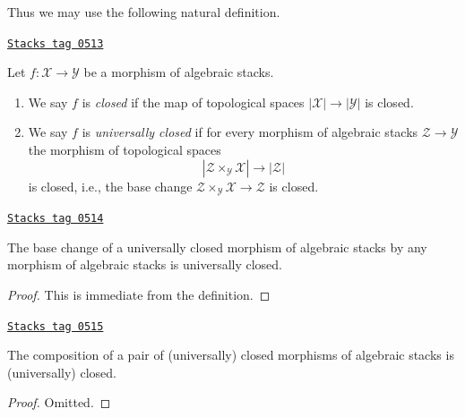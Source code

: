 Thus we may use the following natural definition.

\begin{definition}[Closed]
\label{stacks-morphisms-definition-closed}
\href{https://stacks.math.columbia.edu/tag/0513}{\texttt{Stacks tag 0513}}

Let $f : \mathcal{X} \to \mathcal{Y}$ be a morphism of algebraic stacks.
\begin{enumerate}
\item We say $f$ is {\it closed} if the map of topological
spaces $|\mathcal{X}| \to |\mathcal{Y}|$ is closed.
\item We say $f$ is {\it universally closed} if for every morphism
of algebraic stacks $\mathcal{Z} \to \mathcal{Y}$
the morphism of topological spaces
$$
|\mathcal{Z} \times_\mathcal{Y} \mathcal{X}| \to |\mathcal{Z}|
$$
is closed, i.e., the base change
$\mathcal{Z} \times_\mathcal{Y} \mathcal{X} \to \mathcal{Z}$ is closed.
\end{enumerate}
\end{definition}

\begin{lemma}
\label{stacks-morphisms-lemma-base-change-universally-closed}
\href{https://stacks.math.columbia.edu/tag/0514}{\texttt{Stacks tag 0514}}

The base change of a universally closed morphism of algebraic stacks
by any morphism of algebraic stacks is universally closed.
\end{lemma}

\begin{proof}
This is immediate from the definition.
\end{proof}

\begin{lemma}
\label{stacks-morphisms-lemma-composition-universally-closed}
\href{https://stacks.math.columbia.edu/tag/0515}{\texttt{Stacks tag 0515}}

The composition of a pair of (universally) closed morphisms of
algebraic stacks is (universally) closed.
\end{lemma}

\begin{proof}
Omitted.
\end{proof}

